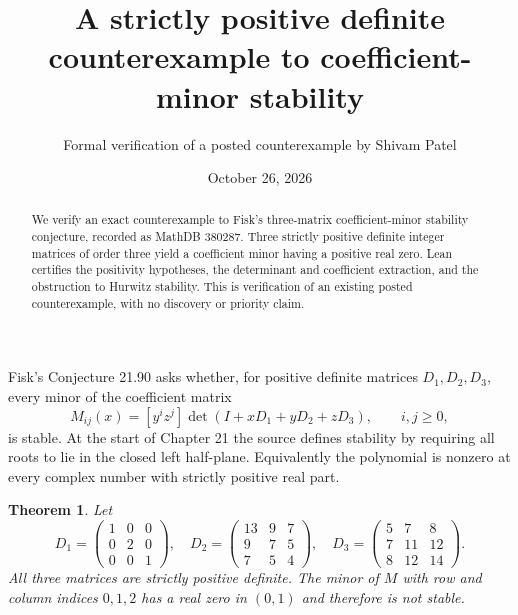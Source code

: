 \documentclass[11pt]{article}
\title{A strictly positive definite counterexample to coefficient-minor stability}
\author{Formal verification of a posted counterexample by Shivam Patel}
\date{October 26, 2026}
\newtheorem{theorem}{Theorem}
\begin{document}
\maketitle
\begin{abstract}
We verify an exact counterexample to Fisk's three-matrix coefficient-minor stability conjecture, recorded as MathDB 380287. Three strictly positive definite integer matrices of order three yield a coefficient minor having a positive real zero. Lean certifies the positivity hypotheses, the determinant and coefficient extraction, and the obstruction to Hurwitz stability. This is verification of an existing posted counterexample, with no discovery or priority claim.
\end{abstract}
Fisk's Conjecture 21.90 asks whether, for positive definite matrices $D_1,D_2,D_3$, every minor of the coefficient matrix
\[
 M_{ij}(x)=[y^iz^j]\det(I+xD_1+yD_2+zD_3),\qquad i,j\geq0,
\]
is stable. At the start of Chapter 21 the source defines stability by requiring all roots to lie in the closed left half-plane. Equivalently the polynomial is nonzero at every complex number with strictly positive real part.
\begin{theorem}
Let
\[
D_1=\begin{pmatrix}1&0&0\\0&2&0\\0&0&1\end{pmatrix},\quad
D_2=\begin{pmatrix}13&9&7\\9&7&5\\7&5&4\end{pmatrix},\quad
D_3=\begin{pmatrix}5&7&8\\7&11&12\\8&12&14\end{pmatrix}.
\]
All three matrices are strictly positive definite. The minor of $M$ with row and column indices $0,1,2$ has a real zero in $(0,1)$ and therefore is not stable.
\end{theorem}
\end{document}

